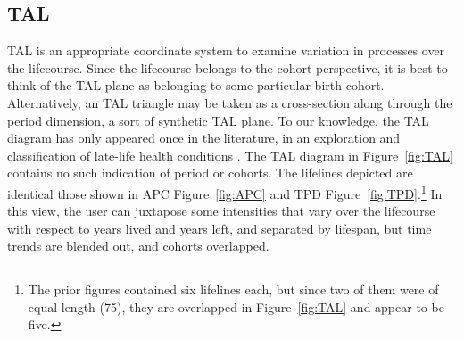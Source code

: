 \documentclass[12pt,oneside,letter]{article} %
\newcommand\tgh[1]{\raisebox{-.25\height}{\texttt{[image: Figures/triadtable/triad\#1.pdf]}}}
\begin{document}
\subsection*{TAL}%
\FloatBarrier
TAL is an appropriate coordinate
system to examine variation in processes over the lifecourse. Since
the lifecourse belongs to the cohort perspective, it is best to think of the TAL
plane as belonging to some particular birth cohort. Alternatively, an TAL
triangle may be taken as a cross-section along through the period dimension, a
sort of synthetic TAL plane. To our knowledge, the TAL diagram has only appeared
once in the literature, in an exploration and classification of late-life health
conditions \citep{riffe2015ttd}. The TAL diagram in Figure~\ref{fig:TAL}
contains no such indication of period or cohorts. The
lifelines depicted are identical those shown in APC Figure~\ref{fig:APC} and
TPD Figure~\ref{fig:TPD}.\footnote{The prior figures contained six lifelines
each, but since two of them were of equal length (75), they are overlapped in
Figure~\ref{fig:TAL} and appear to be five.} In this view, the user can
juxtapose some intensities that vary over the lifecourse with respect to years
lived and years left, and separated by lifespan, but time trends are blended
out, and cohorts overlapped.
\end{document}
